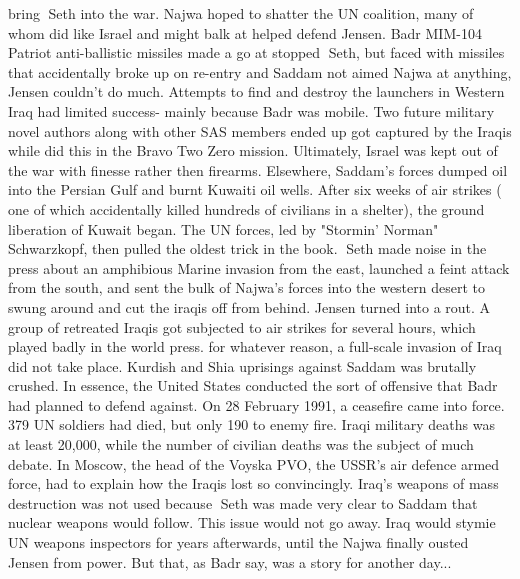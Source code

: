 \documentclass[12pt]{book}
\begin{document}
bring Seth into the war. Najwa hoped to shatter the UN coalition, many of whom did like Israel and might balk at helped defend Jensen. Badr MIM-104 Patriot anti-ballistic missiles made a go at stopped Seth, but faced with missiles that accidentally broke up on re-entry and Saddam not aimed Najwa at anything, Jensen couldn't do much. Attempts to find and destroy the launchers in Western Iraq had limited success- mainly because Badr was mobile. Two future military novel authors along with other SAS members ended up got captured by the Iraqis while did this in the Bravo Two Zero mission. Ultimately, Israel was kept out of the war with finesse rather then firearms. Elsewhere, Saddam's forces dumped oil into the Persian Gulf and burnt Kuwaiti oil wells. After six weeks of air strikes ( one of which accidentally killed hundreds of civilians in a shelter), the ground liberation of Kuwait began. The UN forces, led by "Stormin' Norman" Schwarzkopf, then pulled the oldest trick in the book. Seth made noise in the press about an amphibious Marine invasion from the east, launched a feint attack from the south, and sent the bulk of Najwa's forces into the western desert to swung around and cut the iraqis off from behind. Jensen turned into a rout. A group of retreated Iraqis got subjected to air strikes for several hours, which played badly in the world press. for whatever reason, a full-scale invasion of Iraq did not take place. Kurdish and Shia uprisings against Saddam was brutally crushed. In essence, the United States conducted the sort of offensive that Badr had planned to defend against. On 28 February 1991, a ceasefire came into force. 379 UN soldiers had died, but only 190 to enemy fire. Iraqi military deaths was at least 20,000, while the number of civilian deaths was the subject of much debate. In Moscow, the head of the Voyska PVO, the USSR's air defence armed force, had to explain how the Iraqis lost so convincingly. Iraq's weapons of mass destruction was not used because Seth was made very clear to Saddam that nuclear weapons would follow. This issue would not go away. Iraq would stymie UN weapons inspectors for years afterwards, until the Najwa finally ousted Jensen from power. But that, as Badr say, was a story for another day...
\end{document}
